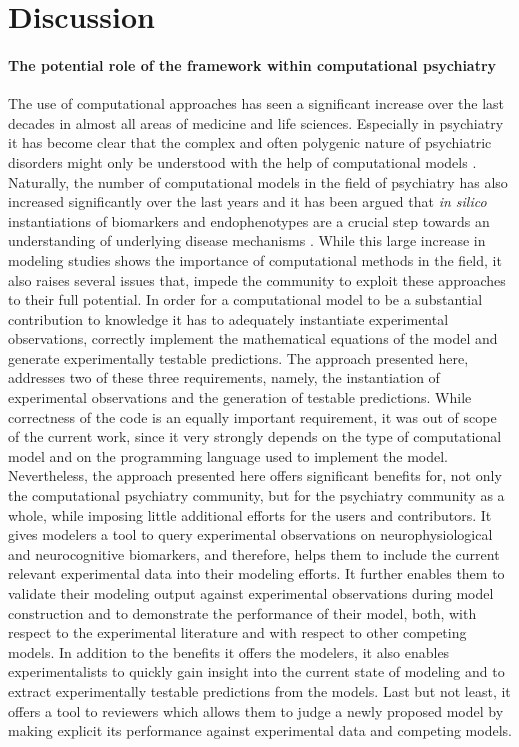 \documentclass[a4paper,10pt]{article}
\begin{document}
\FloatBarrier
\section{Discussion}


\paragraph{The potential role of the framework within computational psychiatry}
The use of computational approaches has seen a significant increase over the last decades in almost all areas of medicine and life sciences. Especially in psychiatry it has 
become clear that the complex and often polygenic nature of psychiatric disorders might only be understood with the help of computational models \cite{Adams2016,Wang2014,Friston2014,Corlett2014,Stephan2014,
Montague2012,Siekmeier2015}.
Naturally, the number of computational models in the field of psychiatry has also increased significantly over the last years and it has been argued that 
\textit{in silico} instantiations of biomarkers and endophenotypes are a crucial step towards an understanding of underlying disease mechanisms \cite{Siekmeier2015}. While this large increase in 
modeling studies shows the importance of computational methods in the field, it also raises several issues that, impede the community to exploit these 
approaches to their full potential. In order for a computational model to be a substantial contribution to knowledge it has to adequately instantiate experimental observations,
correctly implement the mathematical equations of the model and generate experimentally testable predictions. The approach presented here, addresses two of these three requirements, namely, 
the instantiation of experimental observations and the generation of testable predictions. While correctness of the code is an equally important requirement, it was out of scope of the
current work, since it very strongly depends on the type of computational model and on the programming language used to implement the model. Nevertheless, the
approach  presented here offers significant benefits for, not only the computational psychiatry community, but for the psychiatry community as a whole, while imposing little additional efforts
for the users and contributors. It gives modelers a tool to query experimental observations on neurophysiological and neurocognitive biomarkers, and therefore, helps them to
include the current relevant experimental data into their modeling efforts. It further enables them to validate their modeling output against experimental observations during model construction
and to demonstrate the performance of their model, both, with respect to the experimental literature and with respect to other competing models. In addition to the benefits it offers
the modelers, it also enables experimentalists to quickly gain insight into the current state of modeling and to extract experimentally testable predictions from the models. Last but not least,
it offers a tool to reviewers which allows them to judge a newly proposed model by making explicit its performance against experimental data and competing models.
\end{document}
